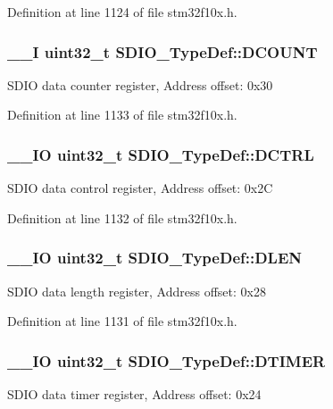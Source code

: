 Definition at line 1124 of file stm32f10x.\-h.

\hypertarget{struct_s_d_i_o___type_def_a0366564e2795952d520c0de4be70020f}{
\subsubsection[{D\-C\-O\-U\-N\-T}]{\setlength{\rightskip}{0pt plus 5cm}\-\_\-\-\_\-\-I {\bf uint32\-\_\-t} S\-D\-I\-O\-\_\-\-Type\-Def\-::\-D\-C\-O\-U\-N\-T}}\label{struct_s_d_i_o___type_def_a0366564e2795952d520c0de4be70020f}
S\-D\-I\-O data counter register, Address offset\-: 0x30 

Definition at line 1133 of file stm32f10x.\-h.

\hypertarget{struct_s_d_i_o___type_def_a801519a7af801ad43b88007bf4e2e906}{
\subsubsection[{D\-C\-T\-R\-L}]{\setlength{\rightskip}{0pt plus 5cm}\-\_\-\-\_\-\-I\-O {\bf uint32\-\_\-t} S\-D\-I\-O\-\_\-\-Type\-Def\-::\-D\-C\-T\-R\-L}}\label{struct_s_d_i_o___type_def_a801519a7af801ad43b88007bf4e2e906}
S\-D\-I\-O data control register, Address offset\-: 0x2\-C 

Definition at line 1132 of file stm32f10x.\-h.

\hypertarget{struct_s_d_i_o___type_def_aa98ab507ed05468ca4baccd1731231cd}{
\subsubsection[{D\-L\-E\-N}]{\setlength{\rightskip}{0pt plus 5cm}\-\_\-\-\_\-\-I\-O {\bf uint32\-\_\-t} S\-D\-I\-O\-\_\-\-Type\-Def\-::\-D\-L\-E\-N}}\label{struct_s_d_i_o___type_def_aa98ab507ed05468ca4baccd1731231cd}
S\-D\-I\-O data length register, Address offset\-: 0x28 

Definition at line 1131 of file stm32f10x.\-h.

\hypertarget{struct_s_d_i_o___type_def_a5af1984c7c00890598ca74fc85449f9f}{
\subsubsection[{D\-T\-I\-M\-E\-R}]{\setlength{\rightskip}{0pt plus 5cm}\-\_\-\-\_\-\-I\-O {\bf uint32\-\_\-t} S\-D\-I\-O\-\_\-\-Type\-Def\-::\-D\-T\-I\-M\-E\-R}}\label{struct_s_d_i_o___type_def_a5af1984c7c00890598ca74fc85449f9f}
S\-D\-I\-O data timer register, Address offset\-: 0x24 

